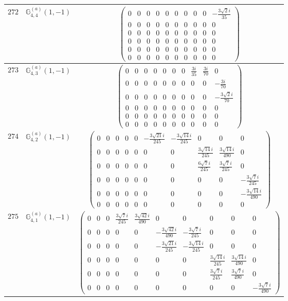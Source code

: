 \documentclass[fleqn,8pt,landscape]{jsarticle}
\begin{document}
\begin{center}
\begin{longtable}{ccc}
$ 272 $ & $ \mathbb{G}_{4,4}^{(a)}(1,-1) $ & $ \begin{pmatrix} 0 & 0 & 0 & 0 & 0 & 0 & 0 & 0 & 0 & - \frac{3 \sqrt{2} i}{35} \\ 0 & 0 & 0 & 0 & 0 & 0 & 0 & 0 & 0 & 0 \\ 0 & 0 & 0 & 0 & 0 & 0 & 0 & 0 & 0 & 0 \\ 0 & 0 & 0 & 0 & 0 & 0 & 0 & 0 & 0 & 0 \\ 0 & 0 & 0 & 0 & 0 & 0 & 0 & 0 & 0 & 0 \\ 0 & 0 & 0 & 0 & 0 & 0 & 0 & 0 & 0 & 0 \end{pmatrix} $ \\ \hline
$ 273 $ & $ \mathbb{G}_{4,3}^{(a)}(1,-1) $ & $ \begin{pmatrix} 0 & 0 & 0 & 0 & 0 & 0 & 0 & \frac{3 i}{35} & \frac{3 i}{70} & 0 \\ 0 & 0 & 0 & 0 & 0 & 0 & 0 & 0 & 0 & - \frac{3 i}{70} \\ 0 & 0 & 0 & 0 & 0 & 0 & 0 & 0 & 0 & - \frac{3 \sqrt{2} i}{70} \\ 0 & 0 & 0 & 0 & 0 & 0 & 0 & 0 & 0 & 0 \\ 0 & 0 & 0 & 0 & 0 & 0 & 0 & 0 & 0 & 0 \\ 0 & 0 & 0 & 0 & 0 & 0 & 0 & 0 & 0 & 0 \end{pmatrix} $ \\ \hline
$ 274 $ & $ \mathbb{G}_{4,2}^{(a)}(1,-1) $ & $ \begin{pmatrix} 0 & 0 & 0 & 0 & 0 & - \frac{3 \sqrt{21} i}{245} & - \frac{3 \sqrt{14} i}{245} & 0 & 0 & 0 \\ 0 & 0 & 0 & 0 & 0 & 0 & 0 & \frac{3 \sqrt{14} i}{245} & \frac{3 \sqrt{14} i}{490} & 0 \\ 0 & 0 & 0 & 0 & 0 & 0 & 0 & \frac{6 \sqrt{7} i}{245} & \frac{3 \sqrt{7} i}{245} & 0 \\ 0 & 0 & 0 & 0 & 0 & 0 & 0 & 0 & 0 & - \frac{3 \sqrt{7} i}{245} \\ 0 & 0 & 0 & 0 & 0 & 0 & 0 & 0 & 0 & - \frac{3 \sqrt{14} i}{490} \\ 0 & 0 & 0 & 0 & 0 & 0 & 0 & 0 & 0 & 0 \end{pmatrix} $ \\ \hline
$ 275 $ & $ \mathbb{G}_{4,1}^{(a)}(1,-1) $ & $ \begin{pmatrix} 0 & 0 & 0 & \frac{3 \sqrt{7} i}{245} & \frac{3 \sqrt{42} i}{490} & 0 & 0 & 0 & 0 & 0 \\ 0 & 0 & 0 & 0 & 0 & - \frac{3 \sqrt{42} i}{490} & - \frac{3 \sqrt{7} i}{245} & 0 & 0 & 0 \\ 0 & 0 & 0 & 0 & 0 & - \frac{3 \sqrt{21} i}{245} & - \frac{3 \sqrt{14} i}{245} & 0 & 0 & 0 \\ 0 & 0 & 0 & 0 & 0 & 0 & 0 & \frac{3 \sqrt{14} i}{245} & \frac{3 \sqrt{14} i}{490} & 0 \\ 0 & 0 & 0 & 0 & 0 & 0 & 0 & \frac{3 \sqrt{7} i}{245} & \frac{3 \sqrt{7} i}{490} & 0 \\ 0 & 0 & 0 & 0 & 0 & 0 & 0 & 0 & 0 & - \frac{3 \sqrt{7} i}{490} \end{pmatrix} $ \\ \hline

\end{longtable}
\end{center}
\end{document}
